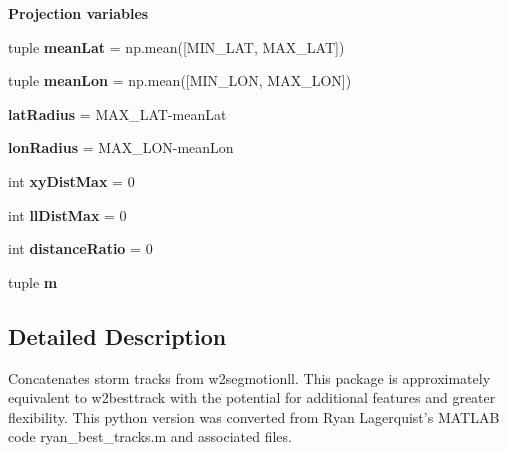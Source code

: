 \begin{Indent}{\bf Projection variables}\par
\begin{DoxyCompactItemize}
\item 
\hypertarget{namespacebest__track_a87caff1d8b2878223dd16efc598be337}{tuple {\bfseries mean\-Lat} = np.\-mean(\mbox{[}M\-I\-N\-\_\-\-L\-A\-T, M\-A\-X\-\_\-\-L\-A\-T\mbox{]})}\label{namespacebest__track_a87caff1d8b2878223dd16efc598be337}

\item 
\hypertarget{namespacebest__track_a77488f5f59485dc15d073feca9c59bb9}{tuple {\bfseries mean\-Lon} = np.\-mean(\mbox{[}M\-I\-N\-\_\-\-L\-O\-N, M\-A\-X\-\_\-\-L\-O\-N\mbox{]})}\label{namespacebest__track_a77488f5f59485dc15d073feca9c59bb9}

\item 
\hypertarget{namespacebest__track_adc0dd2bbbb7ff9b2b32a976c24b34774}{{\bfseries lat\-Radius} = M\-A\-X\-\_\-\-L\-A\-T-\/mean\-Lat}\label{namespacebest__track_adc0dd2bbbb7ff9b2b32a976c24b34774}

\item 
\hypertarget{namespacebest__track_ac71ab7de2992469e2d3fa636d721115f}{{\bfseries lon\-Radius} = M\-A\-X\-\_\-\-L\-O\-N-\/mean\-Lon}\label{namespacebest__track_ac71ab7de2992469e2d3fa636d721115f}

\item 
\hypertarget{namespacebest__track_a1e0a2c8b5aea6474974c39aa070ae3e7}{int {\bfseries xy\-Dist\-Max} = 0}\label{namespacebest__track_a1e0a2c8b5aea6474974c39aa070ae3e7}

\item 
\hypertarget{namespacebest__track_ab1d7dcaed55cd10abe6811353957d4bd}{int {\bfseries ll\-Dist\-Max} = 0}\label{namespacebest__track_ab1d7dcaed55cd10abe6811353957d4bd}

\item 
\hypertarget{namespacebest__track_ac85dda825c35219088dd9babe17b00cc}{int {\bfseries distance\-Ratio} = 0}\label{namespacebest__track_ac85dda825c35219088dd9babe17b00cc}

\item 
tuple {\bfseries m}
\end{DoxyCompactItemize}
\end{Indent}


\subsection{Detailed Description}
Concatenates storm tracks from w2segmotionll. This package is approximately equivalent to w2besttrack with the potential for additional features and greater flexibility. This python version was converted from Ryan Lagerquist's M\-A\-T\-L\-A\-B code ryan\-\_\-best\-\_\-tracks.\-m and associated files.

